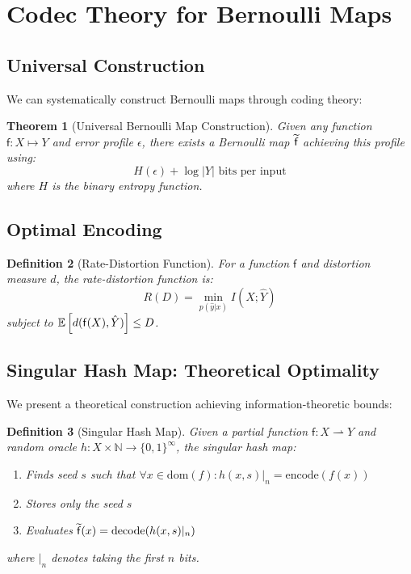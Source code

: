 \documentclass[11pt,final,hidelinks]{article}
\newtheorem{theorem}{Theorem}[section]
\newtheorem{definition}[theorem]{Definition}
\newcommand{\Fun}[1]{\mathsf{#1}}     %
\newcommand{\AFun}[1]{\obs{\mathsf{#1}}}  %
\newcommand{\Set}[1]{#1}              %
\newcommand{\error}{\epsilon}
\newcommand{\pfun}{\rightharpoonup}
\begin{document}
\section{Codec Theory for Bernoulli Maps}

\subsection{Universal Construction}

We can systematically construct Bernoulli maps through coding theory:

\begin{theorem}[Universal Bernoulli Map Construction]
Given any function $\Fun{f} : \Set{X} \mapsto \Set{Y}$ and error profile $\error$, there exists a Bernoulli map $\AFun{f}$ achieving this profile using:
\begin{equation}
H(\error) + \log |\Set{Y}| \text{ bits per input}
\end{equation}
where $H$ is the binary entropy function.
\end{theorem}

\subsection{Optimal Encoding}

\begin{definition}[Rate-Distortion Function]
For a function $\Fun{f}$ and distortion measure $d$, the rate-distortion function is:
\begin{equation}
R(D) = \min_{p(\hat{y}|x)} I(X; \hat{Y})
\end{equation}
subject to $\Expect{d(\Fun{f}(X), \hat{Y})} \leq D$.
\end{definition}

\subsection{Singular Hash Map: Theoretical Optimality}

We present a theoretical construction achieving information-theoretic bounds:

\begin{definition}[Singular Hash Map]
Given a partial function $\Fun{f}: \Set{X} \pfun \Set{Y}$ and random oracle $h: \Set{X} \times \mathbb{N} \to \{0,1\}^\infty$, the singular hash map:
\begin{enumerate}
    \item Finds seed $s$ such that $\forall x \in \text{dom}(f): h(x,s)|_n = \text{encode}(f(x))$
    \item Stores only the seed $s$
    \item Evaluates $\AFun{f}(x) = \text{decode}(h(x,s)|_n)$
\end{enumerate}
where $|_n$ denotes taking the first $n$ bits.
\end{definition}
\end{document}
